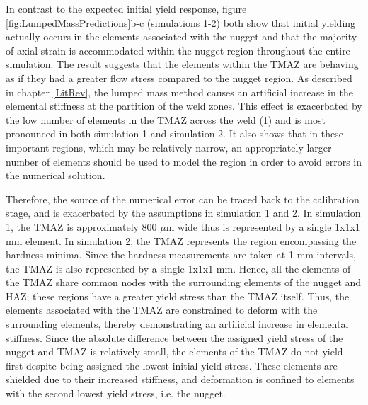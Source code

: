 In contrast to the expected initial yield response, figure \ref{fig:LumpedMassPredictions}b-c (simulations 1-2) both show that initial yielding actually occurs in the elements associated with the nugget and that the majority of axial strain is accommodated within the nugget region throughout the entire simulation. 
The result suggests that the elements within the TMAZ are behaving as if they had a greater flow stress compared to the nugget region. As described in chapter \ref{LitRev}, the lumped mass method causes an artificial increase in the elemental stiffness at the partition of the weld zones. This effect is exacerbated by the low number of elements in the TMAZ across the weld (1) and is most pronounced in both simulation 1 and simulation 2. It also shows that in these important regions, which may be relatively narrow, an appropriately larger number of elements should be used to model the region in order to avoid errors in the numerical solution. 

Therefore, the source of the numerical error can be traced back to the calibration stage, and is exacerbated by the assumptions in simulation 1 and 2. In simulation 1, the TMAZ is approximately 800 $\mu$m wide thus is represented by a single 1x1x1 mm element. In simulation 2, the TMAZ represents the region encompassing the hardness minima. Since the hardness measurements are taken at 1 mm intervals, the TMAZ is also represented by a single 1x1x1 mm. Hence, all the elements of the TMAZ share common nodes with the surrounding elements of the nugget and HAZ; these regions have a greater yield stress than the TMAZ itself. Thus, the elements associated with the TMAZ are constrained to deform with the surrounding elements, thereby demonstrating an artificial increase in elemental stiffness. Since the absolute difference between the assigned yield stress of the nugget and TMAZ is relatively small, the elements of the TMAZ do not yield first despite being assigned the lowest initial yield stress. These elements are shielded due to their increased stiffness, and deformation is confined to elements with the second lowest yield stress, i.e. the nugget. %

